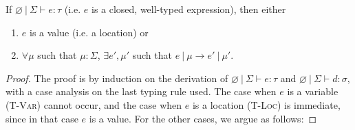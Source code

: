 \documentclass{llncs}
\begin{document}
\begin{theorem}[Progress]
If $\varnothing~|~\Sigma \vdash e : \tau$ (i.e. $e$ is a closed, well-typed expression), then either
\begin{enumerate}
\item $e$ is a value (i.e. a location) or
\item $\forall \mu$ such that $\mu : \Sigma$,
   $\exists e', \mu'$ such that $e~|~\mu \longrightarrow e'~|~\mu'$.
\end{enumerate}
\end{theorem}
\begin{proof} The proof is by induction on the derivation of $\varnothing~|~\Sigma \vdash e : \tau$ and $\varnothing~|~\Sigma \vdash d : \sigma$, with a case analysis on the last typing rule used. The case when $e$ is a variable (\textsc{T-Var}) cannot occur, and the case when $e$ is a location (\textsc{T-Loc}) is immediate, since in that case $e$ is a value. For the other cases, we argue as follows:


\end{proof}
\end{document}
